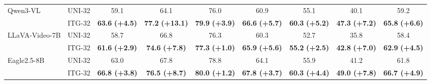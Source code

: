 \begin{table}[h]
{\begin{tabular}{ll|c|c|ccc|c|c}
\midrule
\multirow{2}{*}{Qwen3-VL} & UNI-32 & 59.1 & 64.1 & 76.0 & 60.9 & 55.1 & 40.1 & 59.2 \\
& ITG-32  & \cellcolor[HTML]{DAEFF9} \textbf{63.6} \textbf{(+4.5)} & \cellcolor[HTML]{DAEFF9} \textbf{77.2} \textbf{(+13.1)} & \cellcolor[HTML]{DAEFF9} \textbf{79.9} \textbf{(+3.9)} & \cellcolor[HTML]{DAEFF9} \textbf{66.6} \textbf{(+5.7)} & \cellcolor[HTML]{DAEFF9} \textbf{60.3} \textbf{(+5.2)} & \cellcolor[HTML]{DAEFF9} \textbf{47.3} \textbf{(+7.2)} & \cellcolor[HTML]{DAEFF9} \textbf{65.8} \textbf{(+6.6)} \\
\midrule
\multirow{2}{*}{LLaVA-Video-7B} & UNI-32 & 58.7 & 66.8 & 76.3 & 60.3 & 52.7 & 35.8 & 58.4 \\
& ITG-32  & \cellcolor[HTML]{DAEFF9} \textbf{61.6} \textbf{(+2.9)} & \cellcolor[HTML]{DAEFF9} \textbf{74.6} \textbf{(+7.8)} & \cellcolor[HTML]{DAEFF9} \textbf{77.3} \textbf{(+1.0)} & \cellcolor[HTML]{DAEFF9} \textbf{65.9} \textbf{(+5.6)} & \cellcolor[HTML]{DAEFF9} \textbf{55.2} \textbf{(+2.5)} & \cellcolor[HTML]{DAEFF9} \textbf{42.8} \textbf{(+7.0)} & \cellcolor[HTML]{DAEFF9} \textbf{62.9} \textbf{(+4.5)} \\
\midrule
\multirow{2}{*}{Eagle2.5-8B} & UNI-32 & 63.0 & 67.8 & 78.8 & 64.1 & 55.9 & 41.2 & 61.8 \\
& ITG-32  & \cellcolor[HTML]{DAEFF9} \textbf{66.8 (+3.8)} & \cellcolor[HTML]{DAEFF9} \textbf{76.5 (+8.7)} & \cellcolor[HTML]{DAEFF9} \textbf{80.0 (+1.2)} & \cellcolor[HTML]{DAEFF9} \textbf{67.8 (+3.7)} & \cellcolor[HTML]{DAEFF9} \textbf{60.3 (+4.4)} & \cellcolor[HTML]{DAEFF9} \textbf{49.0 (+7.8)} &
\cellcolor[HTML]{DAEFF9} \textbf{66.7 (+4.9)} \\
\bottomrule
\end{tabular}}
\label{tab:video}
\vspace{-2mm}
\end{table}
